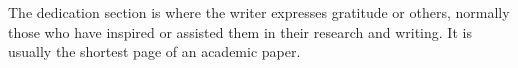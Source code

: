 The dedication section is where the writer expresses gratitude or others, normally those who have inspired or assisted them in their research
and writing. It is usually the shortest page of an academic paper.